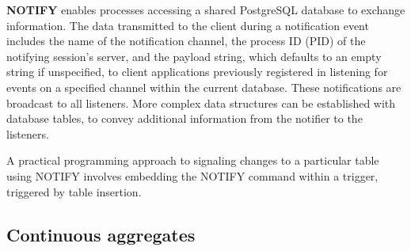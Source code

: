 
\textbf{NOTIFY} enables processes accessing a shared PostgreSQL database to exchange information. The data transmitted to the client during a notification event includes the name of the notification channel, the process ID (PID) of the notifying session's server, and the payload string, which defaults to an empty string if unspecified, to client applications previously registered in listening for events on a specified channel within the current database. These notifications are broadcast to all listeners. More complex data structures can be established with database tables, to convey additional information from the notifier to the listeners. 

A practical programming approach to signaling changes to a particular table using NOTIFY involves embedding the NOTIFY command within a trigger, triggered by table insertion.




\subsection{Continuous aggregates}

